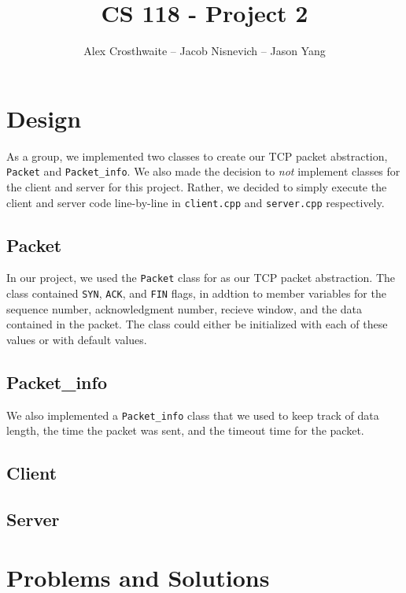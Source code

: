 \documentclass{article}
\begin{document}
\title{CS 118 - Project 2}
\author{Alex Crosthwaite -- Jacob Nisnevich -- Jason Yang}

\maketitle

\section{Design}

As a group, we implemented two classes to create our TCP packet abstraction, \texttt{Packet} and \texttt{Packet\_info}. We also made the decision to \textit{not} implement classes for the client and server for this project. Rather, we decided to simply execute the client and server code line-by-line in \texttt{client.cpp} and \texttt{server.cpp} respectively.

\subsection{Packet}

In our project, we used the \texttt{Packet} class for as our TCP packet abstraction. The class contained \texttt{SYN}, \texttt{ACK}, and \texttt{FIN} flags, in addtion to member variables for the sequence number, acknowledgment number, recieve window, and the data contained in the packet. The class could either be initialized with each of these values or with default values.

\subsection{Packet\_info}

We also implemented a \texttt{Packet\_info} class that we used to keep track of data length, the time the packet was sent, and the timeout time for the packet.

\subsection{Client}

\subsection{Server}

\section{Problems and Solutions}
\end{document}
